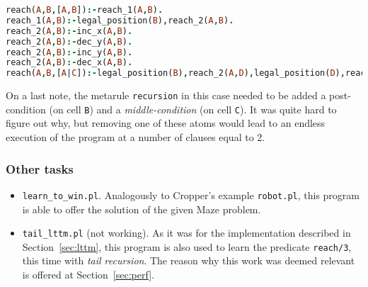 \begin{lstlisting}[label={lst:res_rfsm},language=Prolog, caption=Result of \texttt{reach\_from\_scratch\_memory.pl}, belowcaptionskip=1cm]
reach(A,B,[A,B]):-reach_1(A,B).
reach_1(A,B):-legal_position(B),reach_2(A,B).
reach_2(A,B):-inc_x(A,B).
reach_2(A,B):-dec_y(A,B).
reach_2(A,B):-inc_y(A,B).
reach_2(A,B):-dec_x(A,B).
reach(A,B,[A|C]):-legal_position(B),reach_2(A,D),legal_position(D),reach(D,B,C).
\end{lstlisting}
On a last note, the metarule \texttt{recursion} in this case needed to be added a post-condition (on cell \texttt{B}) and a \emph{middle-condition}
(on cell \texttt{C}). It was quite hard to figure out why, but removing one of these atoms would lead to an endless execution of the program at a
number of clauses equal to 2.

\subsubsection{Other tasks}
\begin{itemize}
    \item \texttt{learn\_to\_win.pl}. Analogously to Cropper's example \texttt{robot.pl}, this program is able to offer the solution of the given Maze problem.
    \item \texttt{tail\_lttm.pl} (not working). As it was for the implementation described in Section~\ref{sec:lttm}, this program is also used to learn the predicate \texttt{reach/3}, this time with \emph{tail recursion}. The reason why this work was deemed relevant is offered at Section~\ref{sec:perf}.
\end{itemize}
\newpage